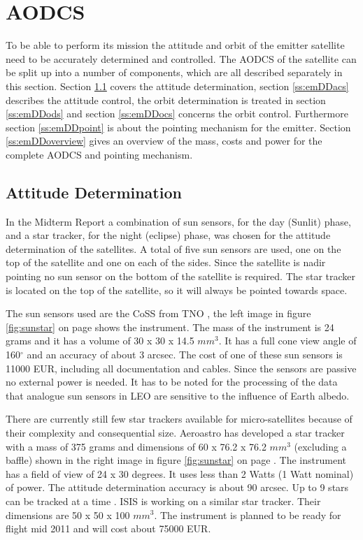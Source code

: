 \section{\acl{AODCS}}
\label{emDDadcs}
To be able to perform its mission the attitude and orbit of the emitter satellite need to be accurately determined and controlled. The \ac{AODCS} of the satellite can be split up into a number of components, which are all described separately in this section. Section \ref{ss:emDDads} covers the attitude determination, section \ref{ss:emDDacs} describes the attitude control, the orbit determination is treated in section \ref{ss:emDDods} and section \ref{ss:emDDocs} concerns the orbit control. Furthermore section \ref{ss:emDDpoint} is about the pointing mechanism for the emitter. Section \ref{ss:emDDoverview} gives an overview of the mass, costs and power for the complete \ac{AODCS} and pointing mechanism.

\subsection{Attitude Determination}
\label{ss:emDDads}
In the Midterm Report \cite{midterm} a combination of sun sensors, for the day (Sunlit) phase, and a star tracker, for the night (eclipse) phase, was chosen for the attitude determination of the satellites. A total of five sun sensors are used, one on the top of the satellite and one on each of the sides. Since the satellite is nadir pointing no sun sensor on the bottom of the satellite is required. The star tracker is located on the top of the satellite, so it will always be pointed towards space.

The sun sensors used are the \ac{CoSS} from TNO \cite{tnoweb}, the left image in figure \ref{fig:sunstar} on page \pageref{fig:sunstar} shows the instrument. The mass of the instrument is 24 grams and it has a volume of 30 x 30 x 14.5 $mm^3$. It has a full cone view angle of 160${}^\circ$ and an accuracy of about 3 arcsec. The cost of one of these sun sensors is 11000 EUR, including all documentation and cables. Since the sensors are passive no external power is needed. It has to be noted for the processing of the data that analogue sun sensors in \ac{LEO} are sensitive to the influence of Earth albedo.

There are currently still few star trackers available for micro-satellites because of their complexity and consequential size. Aeroastro has developed a star tracker with a mass of 375 grams and dimensions of 60 x 76.2 x 76.2 $mm^3$ (excluding a baffle) shown in the right image in figure \ref{fig:sunstar} on page \pageref{fig:sunstar}. The instrument has a field of view of 24 x 30 degrees. It uses less than 2 Watts (1 Watt nominal) of power. The attitude determination accuracy is about 90 arcsec. Up to 9 stars can be tracked at a time \cite{aeromst}. \ac{ISIS} \cite{cubesatshop} is working on a similar star tracker. Their dimensions are 50 x 50 x 100 $mm^3$. The instrument is planned to be ready for flight mid 2011 and will cost about 75000 EUR. 

